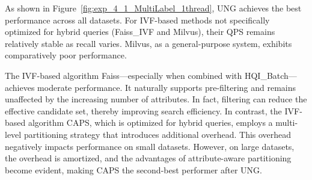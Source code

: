 \documentclass[sigconf, nonacm]{acmart}
\begin{document}
	As shown in Figure~\ref{fig:exp_4_1_MultiLabel_1thread}, UNG achieves the best performance across all datasets. For IVF-based methods not specifically optimized for hybrid queries (Faiss\_IVF and Milvus), their QPS remains relatively stable as recall varies. Milvus, as a general-purpose system, exhibits comparatively poor performance. 
	

		The IVF-based algorithm Faiss---especially when combined with HQI\_Batch---achieves moderate performance. It naturally supports pre-filtering and remains unaffected by the increasing number of attributes. In fact, filtering can reduce the effective candidate set, thereby improving search efficiency. In contrast, the IVF-based algorithm CAPS, which is optimized for hybrid queries, employs a multi-level partitioning strategy that introduces additional overhead. This overhead negatively impacts performance on small datasets. However, on large datasets, the overhead is amortized, and the advantages of attribute-aware partitioning become evident, making CAPS the second-best performer after UNG.
	
	
	
	
\end{document}
